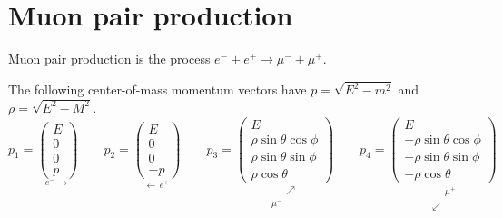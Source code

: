 

\section*{Muon pair production}

Muon pair production is the process $e^-+e^+\rightarrow\mu^-+\mu^+$.

\begin{center}
\end{center}

The following center-of-mass momentum vectors have $p=\sqrt{E^2-m^2}$ and $\rho=\sqrt{E^2-M^2}$.
\begin{equation*}
p_1=\underset{e^- \, \longrightarrow}
{\begin{pmatrix}E\\0\\0\\p\end{pmatrix}}
\qquad
p_2=\underset{\longleftarrow \, e^+}
{\begin{pmatrix}E\\0\\0\\-p\end{pmatrix}}
\qquad
p_3=\underset{\substack{\phantom{\mu^-} \, \nearrow\\\mu^- \, \phantom{\nearrow}}}
{\begin{pmatrix}
E\\
\rho\sin\theta\cos\phi\\
\rho\sin\theta\sin\phi\\
\rho\cos\theta
\end{pmatrix}}
\qquad
p_4=
\underset{\substack{\phantom{\swarrow} \, \mu^+\\\swarrow \, \phantom{\mu^+}}}
{\begin{pmatrix}
E\\
-\rho\sin\theta\cos\phi\\
-\rho\sin\theta\sin\phi\\
-\rho\cos\theta
\end{pmatrix}}
\end{equation*}

